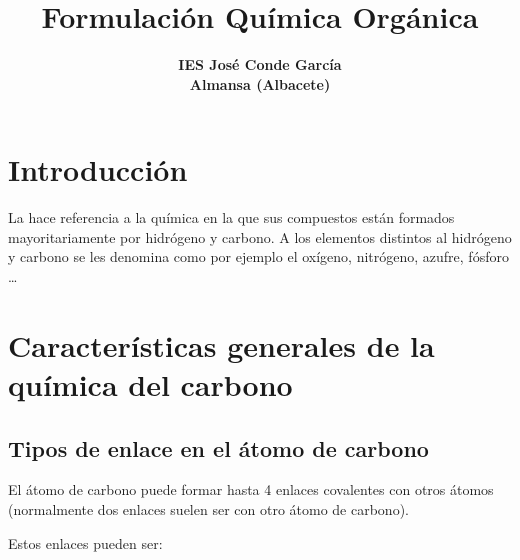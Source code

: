 \documentclass[11pt,a4paper]{article}
\title{\huge \bfseries \sffamily Formulación Química Orgánica}
\author{\Large \bfseries \sffamily IES José Conde García\\\bfseries \sffamily Almansa (Albacete)}
\date{}
\newcommand{\caja}[1]{\begin{center}%
                    \begin{impt}%
                        #1
                    \end{impt}
                    \end{center}}
\begin{document}
\maketitle
\tableofcontents


\newpage{}

\myemptypage{}

\newpage{}

\section{Introducción}



La   hace referencia a la química en la que sus compuestos están formados mayoritariamente por hidrógeno y carbono. A los elementos distintos al hidrógeno y carbono se les denomina  como por ejemplo el oxígeno, nitrógeno, azufre, fósforo \dots

\section{Características generales de la química del carbono}

\subsection{Tipos de enlace en el átomo de carbono}

\caja{El átomo de carbono puede formar hasta 4 enlaces covalentes con otros átomos (normalmente dos enlaces suelen ser con otro átomo de carbono).} 

Estos enlaces pueden ser:
\end{document}
